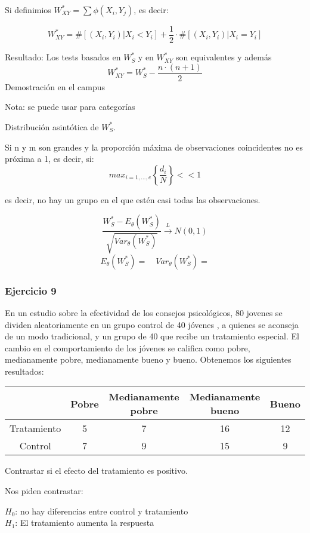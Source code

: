 Si definimios $W_{XY}^*=\sum \phi (X_i,Y_j)$, es decir:

\[
W_{XY}^* = \# [(X_i,Y_i)|X_i<Y_i] + \frac{1}{2} \cdot \# [(X_i,Y_i)|X_i=Y_i]
\]

Resultado: Los tests basados en $W_S^*$ y en $W_{XY}^*$ son equivalentes y además
\[
W_{XY}^*=W_S^*-\frac{n \cdot (n+1)}{2}
\]
Demostración en el campus

Nota: se puede usar para categorías

Distribución asintótica de $W_S^*$.

Si n y m son grandes y la proporción máxima de observaciones coincidentes no es próxima a 1, es decir, si:
\[
max_{i=1,\dots,e}\left\{\frac{d_i}{N} \right\} << 1
\]

es decir, no hay un grupo en el que estén casi todas las observaciones.

\[
\frac{W_S^*-E_\theta(W_S^*)}{\sqrt{Var_\theta(W_S^*)}} \xrightarrow{L} N(0,1)
\]
\[
E_\theta(W_S^*)= \quad Var_\theta(W_S^*)=
\]

\subsubsection*{Ejercicio 9}
En un  estudio sobre la efectividad de los consejos psicológicos, 80 jovenes se dividen aleatoriamente en un grupo control de 40 jóvenes
, a quienes se aconseja de un modo tradicional, y un grupo de 40 que recibe un tratamiento especial. El cambio en el comportamiento de los jóvenes se califica como
pobre, medianamente pobre, medianamente bueno y bueno. Obtenemos los siguientes resultados:
\begin{table}[h!]
    \centering
    \begin{tabular}{|c|c|c|c|c|}
    \hline
    & Pobre & Medianamente pobre & Medianamente bueno & Bueno \\ \hline
    Tratamiento & 5 & 7 & 16 & 12 \\ \hline
    Control     & 7 & 9 & 15 & 9  \\ \hline
    \end{tabular}
\end{table}

Contrastar si el efecto del tratamiento es positivo.

Nos piden contrastar:

\begin{center}
    $H_0$: no hay diferencias entre control y tratamiento \\
    $H_1$: El tratamiento aumenta la respuesta
\end{center}

